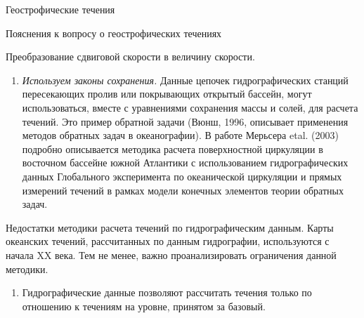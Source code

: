 \begin{chapter}{Геострофические течения}
\begin{section}{Пояснения к вопросу о геострофических течениях}
\begin{paragraph}{Преобразование сдвиговой скорости в величину скорости. }
\begin{enumerate}
\item
\emph{Используем законы сохранения.} Данные цепочек гидрографических
станций пересекающих пролив или покрывающих открытый бассейн, могут
использоваться, вместе с уравнениями сохранения массы и солей, для
расчета течений. Это пример обратной задачи (Вюнш, 1996, описывает
применения методов обратных задач в океанографии). В работе Мерьсера
etal. (2003) подробно описывается методика расчета поверхностной
циркуляции в восточном бассейне южной Атлантики с использованием
гидрографических данных Глобального эксперимента по океанической
циркуляции и прямых измерений течений в рамках модели конечных
элементов теории обратных задач.
%
\end{enumerate}
\end{paragraph}

\begin{paragraph}{Недостатки методики расчета течений по гидрографическим данным.}
Карты океанских течений, рассчитанных по данным гидрографии,
используются с начала XX века. Тем не менее, важно проанализировать
ограничения данной методики.
%

\begin{enumerate}
\item
Гидрографические данные позволяют рассчитать течения только по
отношению к течениям на уровне, принятом за базовый.
%


\end{enumerate}
\end{paragraph}
\end{section}
\end{chapter}
